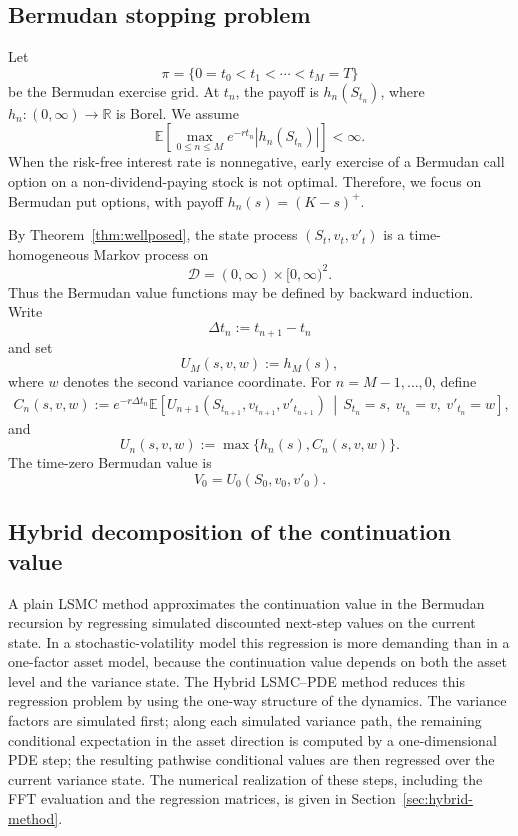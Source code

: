 \documentclass[pdflatex,sn-mathphys-num]{sn-jnl}
\theoremstyle{thmstyleone}%
\theoremstyle{thmstylethree}%
\theoremstyle{thmstyletwo}%
\newcommand{\E}{\mathbb E}
\newcommand{\R}{\mathbb R}
\begin{document}
\subsection{Bermudan stopping problem}\label{sec:bermudan-recursion}

Let
$$
\pi=\{0=t_0<t_1<\cdots<t_M=T\}
$$
be the Bermudan exercise grid. At $t_n$, the payoff is $h_n(S_{t_n})$, where
$h_n:(0,\infty)\to\R$ is Borel. We assume
$$
\E\!\left[
\max_{0\le n\le M}e^{-rt_n}|h_n(S_{t_n})|
\right]<\infty .
$$
When the risk-free interest rate is nonnegative, early exercise of a Bermudan call option on a non-dividend-paying stock is not optimal. Therefore, we focus on Bermudan put options, with payoff $h_n(s)=(K-s)^+$.

By Theorem~\ref{thm:wellposed}, the state process
$(S_t,v_t,v'_t)$ is a time-homogeneous Markov process on
$$
\mathcal D=(0,\infty)\times[0,\infty)^2 .
$$
Thus the Bermudan value functions may be defined by backward induction. Write
$$
\Delta t_n:=t_{n+1}-t_n
$$
and set
$$
U_M(s,v,w):=h_M(s),
$$
where $w$ denotes the second variance coordinate. For $n=M-1,\ldots,0$, define
$$
\begin{aligned}
C_n(s,v,w)
:=
e^{-r\Delta t_n}
\E\!\left[
U_{n+1}(S_{t_{n+1}},v_{t_{n+1}},v'_{t_{n+1}})
\,\middle|\,
S_{t_n}=s,\ v_{t_n}=v,\ v'_{t_n}=w
\right],
\end{aligned}
$$
and
$$
U_n(s,v,w):=\max\{h_n(s),C_n(s,v,w)\}.
$$
The time-zero Bermudan value is
$$
V_0=U_0(S_0,v_0,v'_0).
$$

\subsection{Hybrid decomposition of the continuation value}\label{sec:hybrid-overview}

A plain LSMC method approximates the continuation value in the Bermudan recursion
by regressing simulated discounted next-step values on the current state. In a
stochastic-volatility model this regression is more demanding than in a one-factor
asset model, because the continuation value depends on both the asset level and the
variance state. The Hybrid LSMC--PDE method reduces this regression problem by
using the one-way structure of the dynamics. The variance factors are simulated
first; along each simulated variance path, the remaining conditional expectation in
the asset direction is computed by a one-dimensional PDE step; the resulting
pathwise conditional values are then regressed over the current variance state. The
numerical realization of these steps, including the FFT evaluation and the regression
matrices, is given in Section~\ref{sec:hybrid-method}.
\end{document}
